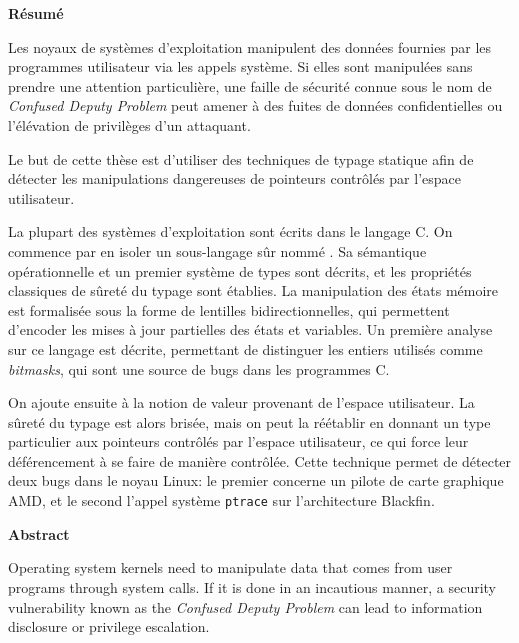 \cleartoverso{}

\begin{headingpage}
\thispagestyle{empty}

\begin{center}\Large \textbf{Résumé}\end{center}

Les noyaux de systèmes d'exploitation manipulent des données fournies par les
programmes utilisateur via les appels système. Si elles sont manipulées sans
prendre une attention particulière, une faille de sécurité connue sous le nom de
\emph{Confused Deputy Problem} peut amener à des fuites de données
confidentielles ou l'élévation de privilèges d'un attaquant.

Le but de cette thèse est d'utiliser des techniques de typage statique afin de
détecter les manipulations dangereuses de pointeurs contrôlés par l'espace
utilisateur.

La plupart des systèmes d'exploitation sont écrits dans le langage C. On
commence par en isoler un sous-langage sûr nommé \langname{}. Sa sémantique
opérationnelle et un premier système de types sont décrits, et les propriétés
classiques de sûreté du typage sont établies. La manipulation des états mémoire
est formalisée sous la forme de lentilles bidirectionnelles, qui permettent
d'encoder les mises à jour partielles des états et variables. Un première
analyse sur ce langage est décrite, permettant de distinguer les entiers
utilisés comme \emph{bitmasks}, qui sont une source de bugs dans les programmes
C.

On ajoute ensuite à \langname{} la notion de valeur provenant de
l'espace utilisateur. La sûreté du typage est alors brisée, mais on peut la
réétablir en donnant un type particulier aux pointeurs contrôlés par l'espace
utilisateur, ce qui force leur déférencement à se faire de manière contrôlée.
Cette technique permet de détecter deux bugs dans le noyau Linux: le premier
concerne un pilote de carte graphique AMD, et le second l'appel système
\texttt{ptrace} sur l'architecture Blackfin.

\begin{center}\Large \textbf{Abstract}\end{center}

Operating system kernels need to manipulate data that comes from user programs
through system calls. If it is done in an incautious manner, a security
vulnerability known as the \emph{Confused Deputy Problem} can lead to
information disclosure or privilege escalation.


\end{headingpage}
